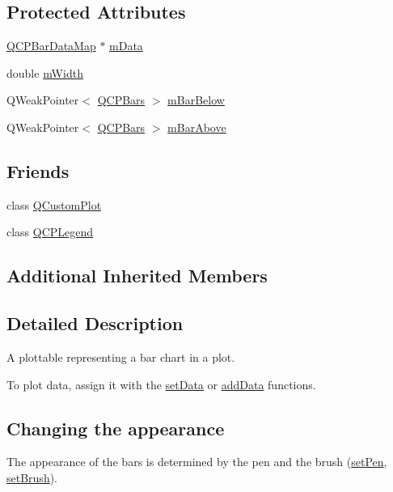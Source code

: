 \subsection*{Protected Attributes}
\begin{DoxyCompactItemize}
\item 
\hyperlink{qcustomplot_8h_aa846c77472cae93def9f1609d0c57191}{Q\-C\-P\-Bar\-Data\-Map} $\ast$ \hyperlink{class_q_c_p_bars_aef28d29d51ef84b608ecd22c55d531ff}{m\-Data}
\item 
double \hyperlink{class_q_c_p_bars_a7c4e0f2246f8133f48a9c3f24cf5b920}{m\-Width}
\item 
Q\-Weak\-Pointer$<$ \hyperlink{class_q_c_p_bars}{Q\-C\-P\-Bars} $>$ \hyperlink{class_q_c_p_bars_a4b8f2970648337e596fca90ebcfdfda9}{m\-Bar\-Below}
\item 
Q\-Weak\-Pointer$<$ \hyperlink{class_q_c_p_bars}{Q\-C\-P\-Bars} $>$ \hyperlink{class_q_c_p_bars_ac321b2b63af9473164580e1bf4ce2b81}{m\-Bar\-Above}
\end{DoxyCompactItemize}
\subsection*{Friends}
\begin{DoxyCompactItemize}
\item 
class \hyperlink{class_q_c_p_bars_a1cdf9df76adcfae45261690aa0ca2198}{Q\-Custom\-Plot}
\item 
class \hyperlink{class_q_c_p_bars_a8429035e7adfbd7f05805a6530ad5e3b}{Q\-C\-P\-Legend}
\end{DoxyCompactItemize}
\subsection*{Additional Inherited Members}


\subsection{Detailed Description}
A plottable representing a bar chart in a plot. 



To plot data, assign it with the \hyperlink{class_q_c_p_bars_aa3435aab19e0a49e4e7b41bd36a8d96b}{set\-Data} or \hyperlink{class_q_c_p_bars_a1f29cf08615040993209147fa68de3f2}{add\-Data} functions.\hypertarget{class_q_c_p_statistical_box_appearance}{}\subsection{Changing the appearance}\label{class_q_c_p_statistical_box_appearance}
The appearance of the bars is determined by the pen and the brush (\hyperlink{class_q_c_p_abstract_plottable_ab74b09ae4c0e7e13142fe4b5bf46cac7}{set\-Pen}, \hyperlink{class_q_c_p_abstract_plottable_a7a4b92144dca6453a1f0f210e27edc74}{set\-Brush}).

